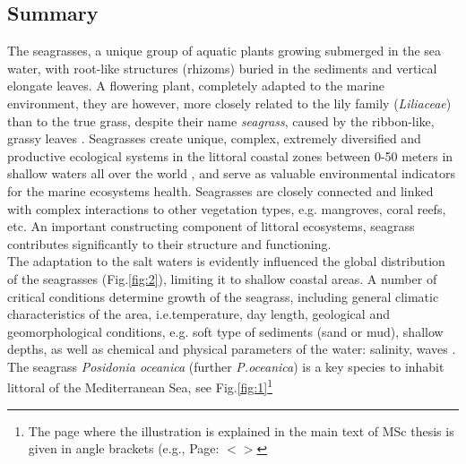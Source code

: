 \documentclass[11pt]{article}
\begin{document}
\subsection{Summary}
The seagrasses, a unique group of aquatic plants growing submerged in the sea water, with root-like
structures (rhizoms) buried in the sediments and vertical elongate leaves. A flowering plant,
completely adapted to the marine environment, they are however, more closely related to the lily family
(\textit{Liliaceae}) than to the true grass, despite their name \textit{seagrass}, caused by the ribbon-like, grassy leaves
\cite{McKenzie08}\label{McKenzie08}. Seagrasses create unique, complex, extremely diversified and productive ecological systems in the
littoral coastal zones between 0-50 meters in shallow waters all over the world \cite{Hogarth07}\label{Hogarth07}, and
serve as valuable environmental indicators for the marine ecosystems health. Seagrasses are closely
connected and linked with complex interactions to other vegetation types, e.g. mangroves, coral reefs,
etc. An important constructing component of littoral ecosystems, seagrass contributes significantly to
their structure and functioning.\\
The adaptation to the salt waters is evidently influenced the global distribution of the seagrasses (Fig.\ref{fig:2}),
limiting it to shallow coastal areas. A number of critical conditions determine growth of the seagrass,
including general climatic characteristics of the area, i.e.temperature, day length, geological and
geomorphological conditions, e.g. soft type of sediments (sand or mud), shallow depths, as well as
chemical and physical parameters of the water: salinity, waves \cite{McKenzie02}\label{McKenzie02}.
The seagrass \textit{Posidonia oceanica} (further \textit{P.oceanica}) is a key species to inhabit littoral of the
Mediterranean Sea, see Fig.\ref{fig:1}\footnote{The page where the illustration is explained in the main text of MSc thesis is given in angle brackets (e.g., Page: $<$\pageref{page-40}$>$}\label{page-1}
\end{document}
